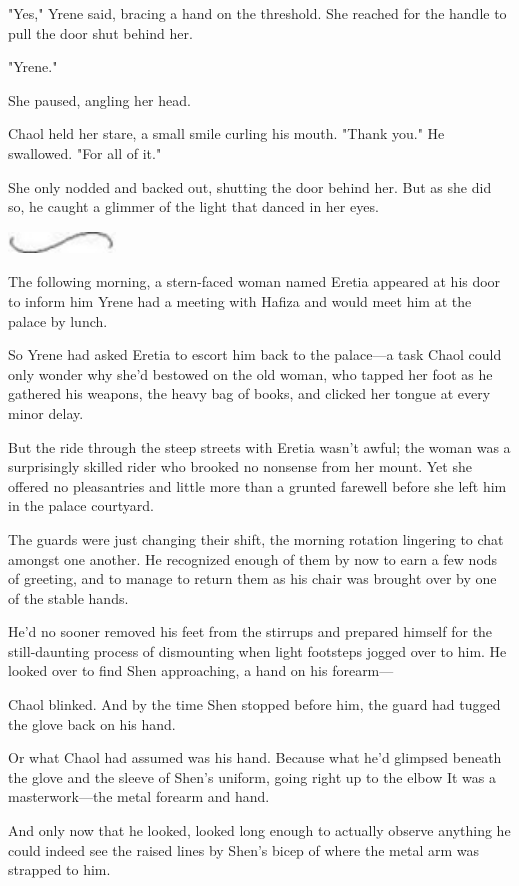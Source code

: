 "Yes," Yrene said, bracing a hand on the threshold. She reached for the handle to pull the door shut behind her.

"Yrene."

She paused, angling her head.

Chaol held her stare, a small smile curling his mouth. "Thank you." He swallowed. "For all of it."

She only nodded and backed out, shutting the door behind her. But as she did so, he caught a glimmer of the light that danced in her eyes.

\includegraphics[width=1.12in,height=0.24in]{images/seperator}

The following morning, a stern-faced woman named Eretia appeared at his door to inform him Yrene had a meeting with Hafiza and would meet him at the palace by lunch.

So Yrene had asked Eretia to escort him back to the palace---a task Chaol could only wonder why she'd bestowed on the old woman, who tapped her foot as he gathered his weapons, the heavy bag of books, and clicked her tongue at every minor delay.

But the ride through the steep streets with Eretia wasn't awful; the woman was a surprisingly skilled rider who brooked no nonsense from her mount. Yet she offered no pleasantries and little more than a grunted farewell before she left him in the palace courtyard.

The guards were just changing their shift, the morning rotation lingering to chat amongst one another. He recognized enough of them by now to earn a few nods of greeting, and to manage to return them as his chair was brought over by one of the stable hands.

He'd no sooner removed his feet from the stirrups and prepared himself for the still-daunting process of dismounting when light footsteps jogged over to him. He looked over to find Shen approaching, a hand on his forearm---

Chaol blinked. And by the time Shen stopped before him, the guard had tugged the glove back on his hand.

Or what Chaol had assumed was his hand. Because what he'd glimpsed beneath the glove and the sleeve of Shen's uniform, going right up to the elbow  It was a masterwork---the metal forearm and hand.

And only now that he looked, looked long enough to actually observe anything  he could indeed see the raised lines by Shen's bicep of where the metal arm was strapped to him.

